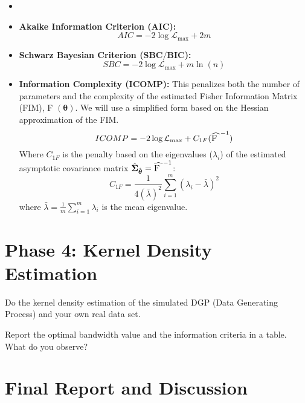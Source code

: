 \documentclass[12pt,thmsa]{article}
\begin{document}
\begin{itemize}
\item \smallskip

\item \textbf{Akaike Information Criterion (}$\mathbf{AIC}$\textbf{):} 
\[
AIC=-2\log \mathcal{L}_{\max }+2m 
\]

\item \textbf{Schwarz Bayesian Criterion (}$\mathbf{SBC/BIC}$\textbf{):} 
\[
SBC=-2\log \mathcal{L}_{\max }+m\ln (n) 
\]

\item \textbf{Information Complexity (}$\mathbf{ICOMP}$\textbf{):} This
penalizes both the number of parameters and the complexity of the estimated
Fisher Information Matrix (FIM), \textsc{F }$(\boldsymbol{\theta })$. We
will use a simplified form based on the Hessian approximation of the FIM. 
\[
ICOMP=-2\log \mathcal{L}_{\max }+C_{1F}(\widehat{\text{\textsc{F }}}^{-1}) 
\]%
Where $C_{1F}$ is the penalty based on the eigenvalues ($\lambda _{i}$) of
the estimated asymptotic covariance matrix $\hat{\mathbf{\Sigma }}_{\hat{%
\boldsymbol{\theta }}}=\widehat{\text{\textsc{F }}}^{-1}$: 
\[
C_{1F}=\frac{1}{4(\bar{\lambda})^{2}}\sum_{i=1}^{m}(\lambda _{i}-\bar{\lambda%
})^{2} 
\]%
where $\bar{\lambda}=\frac{1}{m}\sum_{i=1}^{m}\lambda _{i}$ is the mean
eigenvalue.
\end{itemize}

\pagebreak

\vspace{1pt}

\section{\protect\vspace{1pt}Phase 4: Kernel Density Estimation}

\vspace{1pt}

\vspace{1pt}Do the kernel density estimation of the simulated DGP (Data
Generating Process) and your own real data set.

Report the optimal bandwidth value and the information criteria in a table.
What do you observe? 

\section{Final Report and Discussion}

\smallskip
\end{document}
